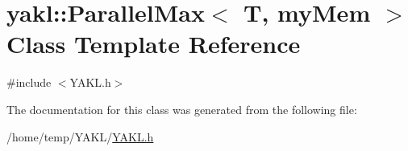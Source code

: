 \hypertarget{classyakl_1_1ParallelMax}{}\section{yakl\+:\+:Parallel\+Max$<$ T, my\+Mem $>$ Class Template Reference}
\label{classyakl_1_1ParallelMax}


{\ttfamily \#include $<$Y\+A\+K\+L.\+h$>$}



The documentation for this class was generated from the following file\+:\begin{DoxyCompactItemize}
\item 
/home/temp/\+Y\+A\+K\+L/\hyperlink{YAKL_8h}{Y\+A\+K\+L.\+h}\end{DoxyCompactItemize}

